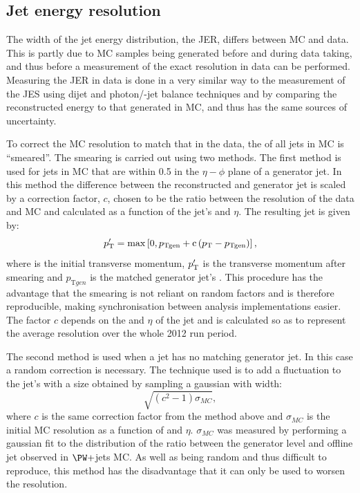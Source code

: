\subsection{Jet energy resolution}
\label{sec:promptjer}
The width of the jet energy distribution, the \ac{JER}, differs between \ac{MC} and data. This is partly due to \ac{MC} samples being generated before and during data taking, and thus before a measurement of the exact resolution in data can be performed. Measuring the \ac{JER} in data is done in a very similar way to the measurement of the \ac{JES} using dijet and photon/\PZ-jet balance techniques and by comparing the reconstructed energy to that generated in \ac{MC}, and thus has the same sources of uncertainty.

To correct the \ac{MC} resolution to match that in the data, the \pt of all jets in \ac{MC} is ``smeared''. The smearing is carried out using two methods. The first method is used for jets in \ac{MC} that are within 0.5 in the $\eta-\phi$ plane of a generator jet. In this method the difference between the reconstructed and generator jet \pt is scaled by a correction factor, $c$, chosen to be the ratio between the resolution of the data and \ac{MC} and calculated as a function of the jet's \pt and $\eta$. The resulting jet \pt is given by:
\begin{equation}
  \label{eq:promptjermatched}
  p_{\mathrm{T}}'=\rm{max}\left[0,\mathnormal{p}_{{\mathrm{T}}gen}+c\left(\mathnormal{p}_{\mathrm{T}}-\mathnormal{p}_{{\mathrm{T}}gen}\right)\right],
\end{equation}
where \pt is the initial transverse momentum, $p_{\mathrm{T}}'$ is the transverse momentum after smearing and $p_{\mathrm{T}gen}$ is the matched generator jet's \pt. This procedure has the advantage that the smearing is not reliant on random factors and is therefore reproducible, making synchronisation between analysis implementations easier. The factor $c$ depends on the \pt and $\eta$ of the jet and is calculated so as to represent the average resolution over the whole 2012 run period. 

The second method is used when a jet has no matching generator jet. In this case a random correction is necessary. The technique used is to add a fluctuation to the jet's \pt with a size obtained by sampling a gaussian with width:
\begin{equation}
  \label{eq:promptjerunmatched}
  \sqrt{\left(c^{2}-1\right)\sigma_{MC}},
\end{equation}
where $c$ is the same correction factor from the method above and $\sigma_{MC}$ is the initial \ac{MC} resolution as a function of \pt and $\eta$. $\sigma_{MC}$ was measured by performing a gaussian fit to the distribution of the ratio between the generator level and offline jet \pt observed in $\PW+$jets \ac{MC}. As well as being random and thus difficult to reproduce, this method has the disadvantage that it can only be used to worsen the resolution. 

